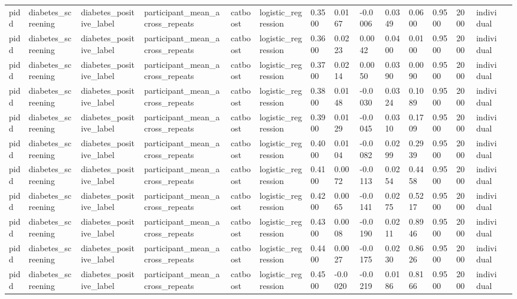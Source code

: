 \begin{tabular}{lllllllllllllll}
pidd & diabetes\_screening & diabetes\_positive\_label & participant\_mean\_across\_repeats & catboost & logistic\_regression & 0.3500 & 0.0167 & -0.0006 & 0.0349 & 0.0600 & 0.9500 & 2000 & individual &  \\
pidd & diabetes\_screening & diabetes\_positive\_label & participant\_mean\_across\_repeats & catboost & logistic\_regression & 0.3600 & 0.0223 & 0.0042 & 0.0400 & 0.0100 & 0.9500 & 2000 & individual &  \\
pidd & diabetes\_screening & diabetes\_positive\_label & participant\_mean\_across\_repeats & catboost & logistic\_regression & 0.3700 & 0.0214 & 0.0050 & 0.0390 & 0.0090 & 0.9500 & 2000 & individual &  \\
pidd & diabetes\_screening & diabetes\_positive\_label & participant\_mean\_across\_repeats & catboost & logistic\_regression & 0.3800 & 0.0148 & -0.0030 & 0.0324 & 0.1089 & 0.9500 & 2000 & individual &  \\
pidd & diabetes\_screening & diabetes\_positive\_label & participant\_mean\_across\_repeats & catboost & logistic\_regression & 0.3900 & 0.0129 & -0.0045 & 0.0310 & 0.1709 & 0.9500 & 2000 & individual &  \\
pidd & diabetes\_screening & diabetes\_positive\_label & participant\_mean\_across\_repeats & catboost & logistic\_regression & 0.4000 & 0.0104 & -0.0082 & 0.0299 & 0.2939 & 0.9500 & 2000 & individual &  \\
pidd & diabetes\_screening & diabetes\_positive\_label & participant\_mean\_across\_repeats & catboost & logistic\_regression & 0.4100 & 0.0072 & -0.0113 & 0.0254 & 0.4458 & 0.9500 & 2000 & individual &  \\
pidd & diabetes\_screening & diabetes\_positive\_label & participant\_mean\_across\_repeats & catboost & logistic\_regression & 0.4200 & 0.0065 & -0.0141 & 0.0275 & 0.5217 & 0.9500 & 2000 & individual &  \\
pidd & diabetes\_screening & diabetes\_positive\_label & participant\_mean\_across\_repeats & catboost & logistic\_regression & 0.4300 & 0.0008 & -0.0190 & 0.0211 & 0.8946 & 0.9500 & 2000 & individual &  \\
pidd & diabetes\_screening & diabetes\_positive\_label & participant\_mean\_across\_repeats & catboost & logistic\_regression & 0.4400 & 0.0027 & -0.0175 & 0.0230 & 0.8626 & 0.9500 & 2000 & individual &  \\
pidd & diabetes\_screening & diabetes\_positive\_label & participant\_mean\_across\_repeats & catboost & logistic\_regression & 0.4500 & -0.0020 & -0.0219 & 0.0186 & 0.8166 & 0.9500 & 2000 & individual &  \\

\end{tabular}
